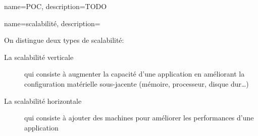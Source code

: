 {
  name=POC,
  description={TODO}
}


{
  name=scalabilité,
  description={On distingue deux types de scalabilité:
\begin{description}
\item[La scalabilité verticale] qui consiste à augmenter la capacité d'une application en améliorant la configuration matérielle sous-jacente (mémoire, processeur, disque dur…)
\item[La scalabilité horizontale] qui consiste à ajouter des machines pour améliorer les performances d'une application
\end{description}}
}

